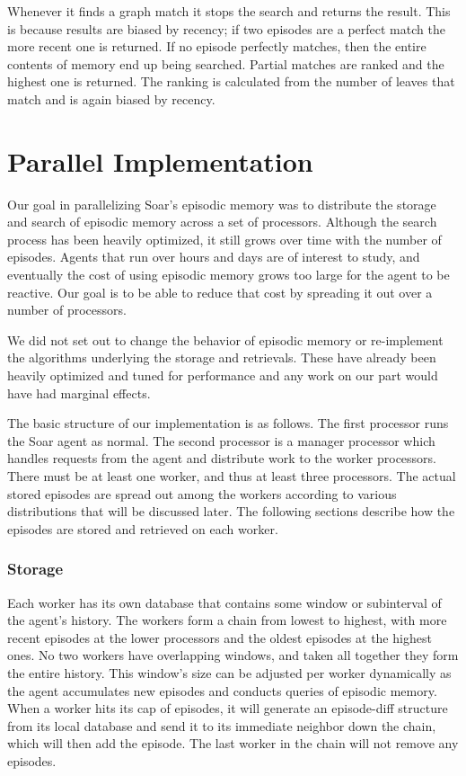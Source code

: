\documentclass[11pt]{article} %
\begin{document}
Whenever it finds a graph match it stops the search and returns the result. This
is because results are biased by recency; if two episodes are a perfect match
the more recent one is returned. If no episode perfectly matches, then the
entire contents of memory end up being searched. Partial matches are ranked and
the highest one is returned. The ranking is calculated from the number of leaves
that match and is again biased by recency.

\section{Parallel Implementation}
Our goal in parallelizing Soar’s episodic memory was to distribute the storage
and search of episodic memory across a set of processors. Although the search
process has been heavily optimized, it still grows over time with the number of
episodes. Agents that run over hours and days are of interest to study, and
eventually the cost of using episodic memory grows too large for the agent to be
reactive. Our goal is to be able to reduce that cost by spreading it out over a
number of processors. 

We did not set out to change the behavior of episodic memory or re-implement the
algorithms underlying the storage and retrievals. These have already been
heavily optimized and tuned for performance and any work on our part would have
had marginal effects. 

The basic structure of our implementation is as follows. The first processor runs
the Soar agent as normal. The second processor is a manager processor which 
handles requests from the agent and distribute work to the worker processors. 
There must be at least one worker, and thus at least three processors. The actual
stored episodes are spread out among the workers according to various distributions
that will be discussed later. The following
sections describe how the episodes are stored and retrieved on each worker.

\subsubsection{Storage}

Each worker has its own database that contains some window or subinterval of the agent's history. 
The workers form a chain from lowest to highest, with more recent episodes at the 
lower processors and the oldest episodes at the highest ones. No two workers have
overlapping windows, and taken all together they form the entire history. 
This window's size can be adjusted per worker dynamically as
the agent accumulates new episodes and conducts queries of episodic memory. 
When a worker hits its cap of episodes, it will generate an episode-diff structure
from its local database and send it to its immediate neighbor down the chain, 
which will then add the episode. The last worker in the chain will not remove any episodes. 
\end{document}
